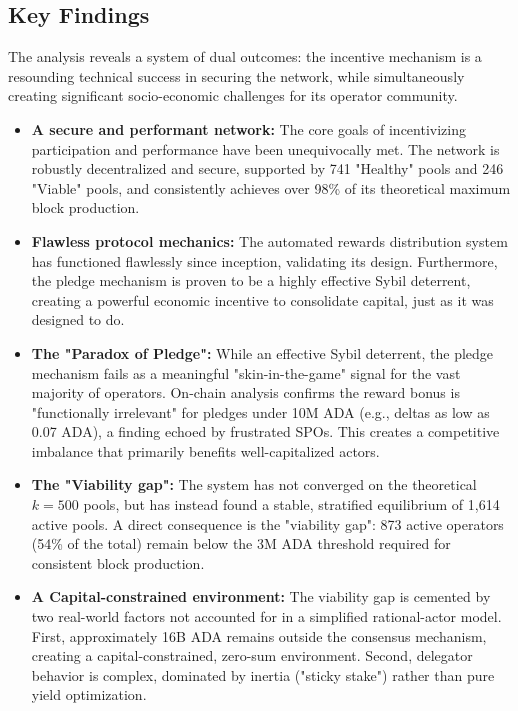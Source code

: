 \documentclass[11pt, letterpaper]{article}
\begin{document}
\subsection*{Key Findings}

The analysis reveals a system of dual outcomes: the incentive mechanism is a resounding technical 
success in securing the network, while simultaneously creating significant socio-economic challenges 
for its operator community.

\begin{itemize}
    \item \textbf{A secure and performant network:} The core goals of incentivizing participation and 
    performance have been unequivocally met. The network is robustly decentralized and secure, supported by 741 
    "Healthy" pools and 246 "Viable" pools, and consistently achieves over 98\% of its theoretical maximum block 
    production.
    
    \item \textbf{Flawless protocol mechanics:} The automated rewards distribution system has functioned 
    flawlessly since inception, validating its design. Furthermore, the pledge mechanism is proven to be a 
    highly effective Sybil deterrent, creating a powerful economic incentive to consolidate capital, just as it 
    was designed to do.
    
    \item \textbf{The "Paradox of Pledge":} While an effective Sybil deterrent, the pledge mechanism 
    fails as a meaningful "skin-in-the-game" signal for the vast majority of operators. On-chain analysis 
    confirms the reward bonus is "functionally irrelevant" for pledges under 10M ADA (e.g., deltas as low 
    as 0.07 ADA), a finding echoed by frustrated SPOs. This creates a competitive imbalance that primarily 
    benefits well-capitalized actors.
    
    \item \textbf{The "Viability gap":} The system has not converged on the theoretical $k=500$ pools, but 
    has instead found a stable, stratified equilibrium of 1,614 active pools. A direct consequence is the 
    "viability gap": 873 active operators (54\% of the total) remain below the 3M ADA threshold required for 
    consistent block production.
    
    \item \textbf{A Capital-constrained environment:} The viability gap is cemented by two real-world factors 
    not accounted for in a simplified rational-actor model. First, approximately 16B ADA remains outside the 
    consensus mechanism, creating a capital-constrained, zero-sum environment. Second, delegator behavior is 
    complex, dominated by inertia ("sticky stake") rather than pure yield optimization.
\end{itemize}
\end{document}
